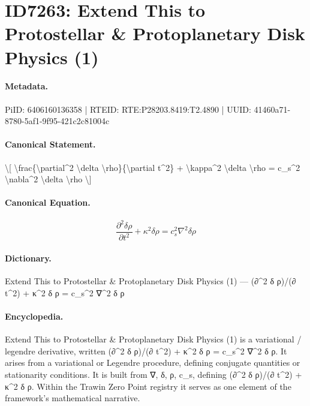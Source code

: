 \section*{ID7263: Extend This to Protostellar \& Protoplanetary Disk Physics (1)}
\paragraph{Metadata.}
PiID: 6406160136358 | RTEID: RTE:P28203.8419:T2.4890 | UUID: 41460a71-8780-5af1-9f95-421c2c81004c

\paragraph{Canonical Statement.}
\textbackslash{}[ \textbackslash{}frac\{\textbackslash{}partial\textasciicircum{}2 \textbackslash{}delta \textbackslash{}rho\}\{\textbackslash{}partial t\textasciicircum{}2\} + \textbackslash{}kappa\textasciicircum{}2 \textbackslash{}delta \textbackslash{}rho = c\_s\textasciicircum{}2 \textbackslash{}nabla\textasciicircum{}2 \textbackslash{}delta \textbackslash{}rho \textbackslash{}]

\paragraph{Canonical Equation.}
\[
\frac{\partial^2 \delta \rho}{\partial t^2} + \kappa^2 \delta \rho = c_s^2 \nabla^2 \delta \rho
\]

\paragraph{Dictionary.}
Extend This to Protostellar \& Protoplanetary Disk Physics (1) — (∂\textasciicircum{}2 δ ρ)/(∂ t\textasciicircum{}2) + κ\textasciicircum{}2 δ ρ = c\_s\textasciicircum{}2 ∇\textasciicircum{}2 δ ρ

\paragraph{Encyclopedia.}
Extend This to Protostellar \& Protoplanetary Disk Physics (1) is a variational / legendre derivative, written (∂\textasciicircum{}2 δ ρ)/(∂ t\textasciicircum{}2) + κ\textasciicircum{}2 δ ρ = c\_s\textasciicircum{}2 ∇\textasciicircum{}2 δ ρ. It arises from a variational or Legendre procedure, defining conjugate quantities or stationarity conditions. It is built from ∇, δ, ρ, c\_s, defining (∂\textasciicircum{}2 δ ρ)/(∂ t\textasciicircum{}2) + κ\textasciicircum{}2 δ ρ. Within the Trawin Zero Point registry it serves as one element of the framework's mathematical narrative.
